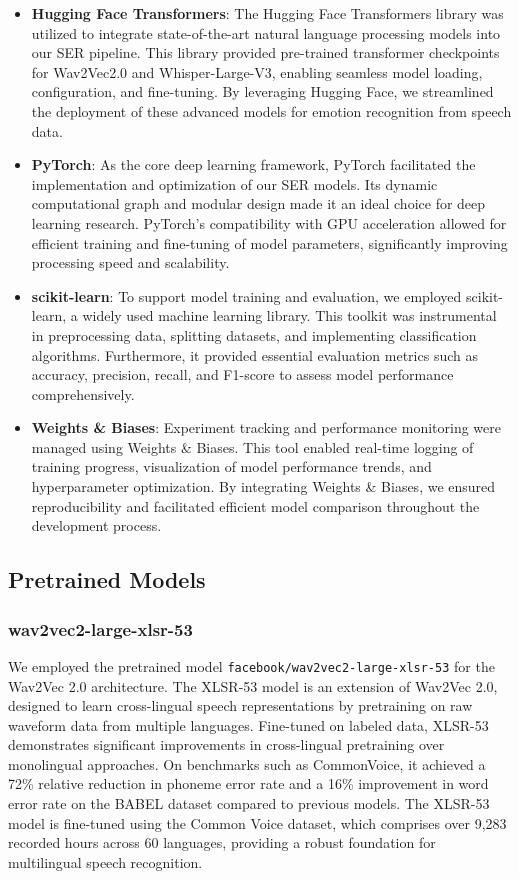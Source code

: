 \documentclass[a4paper,12pt]{article}
\begin{document}
\begin{itemize}
    \item \textbf{Hugging Face Transformers}: The Hugging Face Transformers library was utilized to integrate state-of-the-art natural language processing models into our SER pipeline. This library provided pre-trained transformer checkpoints for Wav2Vec2.0 and Whisper-Large-V3, enabling seamless model loading, configuration, and fine-tuning. By leveraging Hugging Face, we streamlined the deployment of these advanced models for emotion recognition from speech data.
    
    \item \textbf{PyTorch}: As the core deep learning framework, PyTorch facilitated the implementation and optimization of our SER models. Its dynamic computational graph and modular design made it an ideal choice for deep learning research. PyTorch's compatibility with GPU acceleration allowed for efficient training and fine-tuning of model parameters, significantly improving processing speed and scalability.
    
    \item \textbf{scikit-learn}: To support model training and evaluation, we employed scikit-learn, a widely used machine learning library. This toolkit was instrumental in preprocessing data, splitting datasets, and implementing classification algorithms. Furthermore, it provided essential evaluation metrics such as accuracy, precision, recall, and F1-score to assess model performance comprehensively.
    
    \item \textbf{Weights \& Biases}: Experiment tracking and performance monitoring were managed using Weights \& Biases. This tool enabled real-time logging of training progress, visualization of model performance trends, and hyperparameter optimization. By integrating Weights \& Biases, we ensured reproducibility and facilitated efficient model comparison throughout the development process.
\end{itemize}

\subsection{Pretrained Models}
\subsubsection{wav2vec2-large-xlsr-53}
We employed the pretrained model \texttt{facebook/wav2vec2-large-xlsr-53} for the Wav2Vec 2.0 architecture. The XLSR-53 model is an extension of Wav2Vec 2.0, designed to learn cross-lingual speech representations by pretraining on raw waveform data from multiple languages. Fine-tuned on labeled data, XLSR-53 demonstrates significant improvements in cross-lingual pretraining over monolingual approaches. On benchmarks such as CommonVoice, it achieved a 72\% relative reduction in phoneme error rate and a 16\% improvement in word error rate on the BABEL dataset compared to previous models. The XLSR-53 model is fine-tuned using the Common Voice dataset, which comprises over 9,283 recorded hours across 60 languages, providing a robust foundation for multilingual speech recognition.
\end{document}
